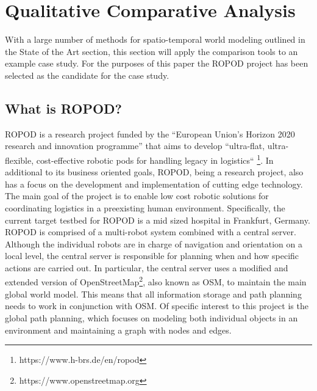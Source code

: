 

  \chapter{Qualitative Comparative Analysis}

  With a large number of methods for spatio-temporal world modeling outlined
  in the State of the Art section, this section will apply the comparison tools
  to an example case study. For the
  purposes of this paper the ROPOD project has been selected as the
  candidate for the case study. \\

  \section{ What is ROPOD? }

  ROPOD is a research project
  funded by the ``European Union's Horizon 2020 research and innovation programme''
  that aims to develop ``ultra-flat, ultra-flexible,
  cost-effective robotic pods for handling legacy in logistics``
  \footnote[1]{https://www.h-brs.de/en/ropod}. In additional to its business
  oriented goals, ROPOD, being a research project, also has a focus on the
  development and implementation of cutting edge technology. The main goal of
  the project is to enable low cost robotic solutions for coordinating logistics
  in a preexisting human environment. Specifically, the current target
  testbed for ROPOD is a mid sized hospital in Frankfurt, Germany.
  ROPOD is comprised of a multi-robot system combined with a central server.
  Although the individual robots are in charge of navigation and orientation
  on a local level, the central server is responsible for planning when and
  how specific actions are carried out. In particular, the central server uses a
  modified and extended version of
  OpenStreetMap\footnote[2]{https://www.openstreetmap.org}, also known as OSM, to
  maintain the main global world model.
  This means that all information storage and path planning needs to work in
  conjunction with OSM. Of specific interest to this project is the global path
  planning, which focuses on modeling both individual objects in an
  environment and maintaining a graph with nodes and edges. \\


